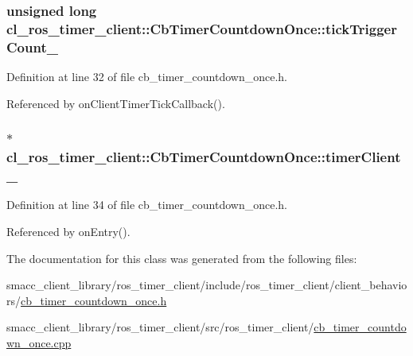 \subsubsection[{\texorpdfstring{tick\+Trigger\+Count\+\_\+}{tickTriggerCount_}}]{\setlength{\rightskip}{0pt plus 5cm}unsigned long cl\+\_\+ros\+\_\+timer\+\_\+client\+::\+Cb\+Timer\+Countdown\+Once\+::tick\+Trigger\+Count\+\_\+\hspace{0.3cm}{\ttfamily [private]}}\hypertarget{classcl__ros__timer__client_1_1CbTimerCountdownOnce_a60dcac52db0a56e1b2f99b55291617ab}{}\label{classcl__ros__timer__client_1_1CbTimerCountdownOnce_a60dcac52db0a56e1b2f99b55291617ab}


Definition at line 32 of file cb\+\_\+timer\+\_\+countdown\+\_\+once.\+h.



Referenced by on\+Client\+Timer\+Tick\+Callback().

\subsubsection[{\texorpdfstring{timer\+Client\+\_\+}{timerClient_}}]{$\ast$ cl\+\_\+ros\+\_\+timer\+\_\+client\+::\+Cb\+Timer\+Countdown\+Once\+::timer\+Client\+\_\+\hspace{0.3cm}{\ttfamily [private]}}\hypertarget{classcl__ros__timer__client_1_1CbTimerCountdownOnce_a467b931f7254a96f66742a6c6626f73e}{}\label{classcl__ros__timer__client_1_1CbTimerCountdownOnce_a467b931f7254a96f66742a6c6626f73e}


Definition at line 34 of file cb\+\_\+timer\+\_\+countdown\+\_\+once.\+h.



Referenced by on\+Entry().



The documentation for this class was generated from the following files\+:\begin{DoxyCompactItemize}
\item 
smacc\+\_\+client\+\_\+library/ros\+\_\+timer\+\_\+client/include/ros\+\_\+timer\+\_\+client/client\+\_\+behaviors/\hyperlink{cb__timer__countdown__once_8h}{cb\+\_\+timer\+\_\+countdown\+\_\+once.\+h}\item 
smacc\+\_\+client\+\_\+library/ros\+\_\+timer\+\_\+client/src/ros\+\_\+timer\+\_\+client/\hyperlink{cb__timer__countdown__once_8cpp}{cb\+\_\+timer\+\_\+countdown\+\_\+once.\+cpp}\end{DoxyCompactItemize}
